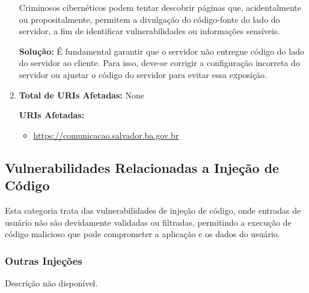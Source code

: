 \documentclass[a4paper,12pt]{article}
\begin{document}
\begin{enumerate}
    Criminosos cibernéticos podem tentar descobrir páginas que, acidentalmente ou propositalmente, permitem a divulgação do código-fonte do lado do servidor, a fim de identificar vulnerabilidades ou informações sensíveis.

\textbf{Solução:} É fundamental garantir que o servidor não entregue código do lado do servidor ao cliente. Para isso, deve-se corrigir a configuração incorreta do servidor ou ajustar o código do servidor para evitar essa exposição.

    \item

\textbf{Total de URIs Afetadas:} None

\textbf{URIs Afetadas:}
\begin{itemize}
    \item \url{https://comunicacao.salvador.ba.gov.br}
\end{itemize}

\end{enumerate}
\subsection{Vulnerabilidades Relacionadas a Injeção de Código}
Esta categoria trata das vulnerabilidades de injeção de código, onde entradas de usuário não são devidamente validadas ou filtradas, permitindo a execução de código malicioso que pode comprometer a aplicação e os dados do usuário.

\subsubsection{Outras Injeções}
Descrição não disponível.
\end{document}
